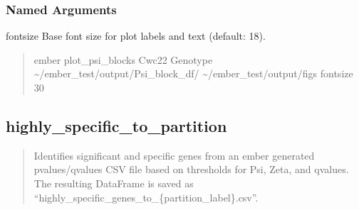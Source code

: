 \documentclass[letterpaper,10pt,english]{sphinxmanual}
\begin{document}
\subsubsection{Named Arguments}
\label{\detokenize{cli:named-arguments_repeat4}}\begin{optionlist}{3cm}
\item [\sphinxhyphen{}\sphinxhyphen{}fontsize]  
\sphinxAtStartPar
Base font size for plot labels and text (default: 18).
\end{optionlist}
\begin{quote}
\begin{description}
\sphinxAtStartPar
ember plot\_psi\_blocks Cwc22 Genotype \textasciitilde{}/ember\_test/output/Psi\_block\_df/ \textasciitilde{}/ember\_test/output/figs \textendash{}fontsize 30

\end{description}
\end{quote}


\subsection{highly\_specific\_to\_partition}
\label{\detokenize{cli:highly_specific_to_partition}}\begin{quote}

\sphinxAtStartPar
Identifies significant and specific genes from an ember generated
p\sphinxhyphen{}values/q\sphinxhyphen{}values CSV file based on thresholds for Psi, Zeta, and q\sphinxhyphen{}values.
The resulting DataFrame is saved as “highly\_specific\_genes\_to\_\{partition\_label\}.csv”.
\end{quote}

\begin{sphinxVerbatim}[commandchars=\\\{\}]
  \PYG{p}{[}\PYG{p}{]} \PYG{p}{[} \PYG{p}{]} \PYG{p}{[} \PYG{p}{]} \PYG{p}{[} \PYG{p}{]}
                                     
\end{sphinxVerbatim}
\end{document}
